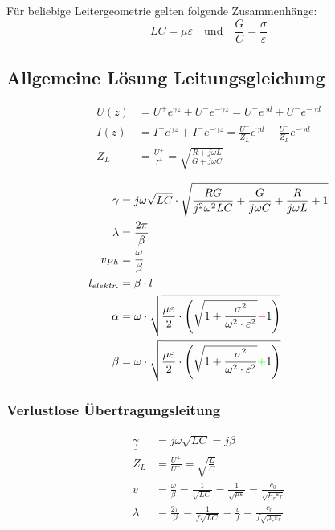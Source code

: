 \vspace{1ex}
Für beliebige Leitergeometrie gelten folgende Zusammenhänge:
\[
    LC = \mu\varepsilon \quad \text{und} \quad \frac{G}{C} = \frac{\sigma}{\varepsilon}
\]

\subsection{Allgemeine Lösung Leitungsgleichung}
\begin{align*}
    U(z) & = U^+ e^{\gamma z} + U^- e^{-\gamma z} = U^+ e^{\gamma d} + U^ - e^{-\gamma d}                      \\
    I(z) & = I^+ e^{\gamma z} + I^- e^{-\gamma z} = \frac{U^+}{Z_L}e^{\gamma d} - \frac{U^-}{Z_L}e^{-\gamma d} \\
    Z_L  & = \frac{U^+}{I^+} = \sqrt{ \frac{R + j \omega L}{G + j \omega C}}
\end{align*}

\begin{align*}
    \gamma      & = j \omega \sqrt{LC} \cdot \sqrt{ \frac{RG}{j^2 \omega^2 LC} + \frac{G}{j \omega C} + \frac{R}{j \omega L} + 1}                             \\
    \lambda     & = \frac{2 \pi}{\beta}                                                                                                                       \\
    v_{Ph}      & = \frac{\omega}{\beta}                                                                                                                      \\
    l_{elektr.} & = \beta \cdot l                                                                                                                             \\
    \alpha      & = \omega \cdot \sqrt{\dfrac{\mu \varepsilon}{2}\cdot \left(\sqrt{1+\dfrac{\sigma^2}{\omega^2\cdot\varepsilon^2}}{\color{red}{-}}1\right)}   \\
    \beta       & = \omega \cdot \sqrt{\dfrac{\mu \varepsilon}{2}\cdot \left(\sqrt{1+\dfrac{\sigma^2}{\omega^2\cdot\varepsilon^2}}{\color{green}{+}}1\right)}
\end{align*}

\subsubsection{Verlustlose Übertragungsleitung}
\begin{align*}
    \underline{\gamma} & = j\omega\sqrt{LC}= j\beta \\
    Z_L                & =\frac{U^+}{U^-}       = \sqrt{\frac{L}{C}}    \\
    v                  & = \frac{\omega}{\beta} = \frac{1}{\sqrt{LC}}= \frac{1}{\sqrt{\mu\varepsilon}}= \frac{c_0}{\sqrt{\mu_r\varepsilon_r}}\\
    \lambda & = \frac{2\pi}{\beta}=\frac{1}{f\sqrt{LC}}= \frac{v}{f}= \frac{c_0}{f\sqrt{\mu_r\varepsilon_r}}
\end{align*}

